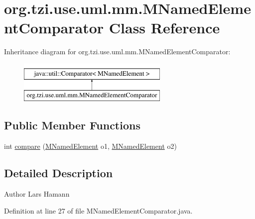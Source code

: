 \hypertarget{classorg_1_1tzi_1_1use_1_1uml_1_1mm_1_1_m_named_element_comparator}{\section{org.\-tzi.\-use.\-uml.\-mm.\-M\-Named\-Element\-Comparator Class Reference}
\label{classorg_1_1tzi_1_1use_1_1uml_1_1mm_1_1_m_named_element_comparator}
}
Inheritance diagram for org.\-tzi.\-use.\-uml.\-mm.\-M\-Named\-Element\-Comparator\-:\begin{figure}[H]
\begin{center}
\leavevmode
\includegraphics[height=2.000000cm]{classorg_1_1tzi_1_1use_1_1uml_1_1mm_1_1_m_named_element_comparator}
\end{center}
\end{figure}
\subsection*{Public Member Functions}
\begin{DoxyCompactItemize}
\item 
int \hyperlink{classorg_1_1tzi_1_1use_1_1uml_1_1mm_1_1_m_named_element_comparator_abddba9335e67660d8c31adca5bc12101}{compare} (\hyperlink{interfaceorg_1_1tzi_1_1use_1_1uml_1_1mm_1_1_m_named_element}{M\-Named\-Element} o1, \hyperlink{interfaceorg_1_1tzi_1_1use_1_1uml_1_1mm_1_1_m_named_element}{M\-Named\-Element} o2)
\end{DoxyCompactItemize}


\subsection{Detailed Description}
\begin{DoxyAuthor}{Author}
Lars Hamann 
\end{DoxyAuthor}


Definition at line 27 of file M\-Named\-Element\-Comparator.\-java.



